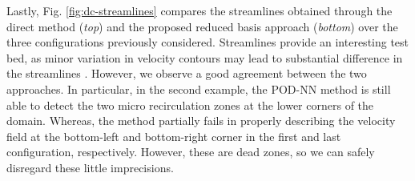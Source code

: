 \documentclass[12pt, a4paper, twoside, openright, notitlepage]{report}
\numberwithin{equation}{chapter}
\theoremstyle{theorem}
\theoremstyle{definition}
\theoremstyle{remark}
\theoremstyle{proposition}
\numberwithin{figure}{chapter}
\begin{document}
		\clearpage
								
		Lastly, Fig. \ref{fig:dc-streamlines} compares the streamlines obtained through the direct method (\emph{top}) and the proposed reduced basis approach (\emph{bottom}) over the three configurations previously considered. Streamlines provide an interesting test bed, as minor variation in velocity contours may lead to substantial difference in the streamlines \cite{Chen17}. However, we observe a good agreement between the two approaches. In particular, in the second example, the POD-NN method is still able to detect the two micro recirculation zones at the lower corners of the domain. Whereas, the method partially fails in properly describing the velocity field at the bottom-left and bottom-right corner in the first and last configuration, respectively. However, these are dead zones, so we can safely disregard these little imprecisions.
				
\end{document}
